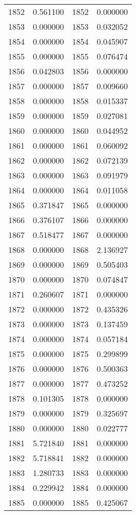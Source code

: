 \documentclass[12pt]{article}
\begin{document}
\begin{longtable}{@{}cccc@{}}
1852 & 0.561100 & 1852 & 0.000000 \\
1853 & 0.000000 & 1853 & 0.032052 \\
1854 & 0.000000 & 1854 & 0.045907 \\
1855 & 0.000000 & 1855 & 0.076474 \\
1856 & 0.042803 & 1856 & 0.000000 \\
1857 & 0.000000 & 1857 & 0.009660 \\
1858 & 0.000000 & 1858 & 0.015337 \\
1859 & 0.000000 & 1859 & 0.027081 \\
1860 & 0.000000 & 1860 & 0.044952 \\
1861 & 0.000000 & 1861 & 0.060092 \\
1862 & 0.000000 & 1862 & 0.072139 \\
1863 & 0.000000 & 1863 & 0.091979 \\
1864 & 0.000000 & 1864 & 0.011058 \\
1865 & 0.371847 & 1865 & 0.000000 \\
1866 & 0.376107 & 1866 & 0.000000 \\
1867 & 0.518477 & 1867 & 0.000000 \\
1868 & 0.000000 & 1868 & 2.136927 \\
1869 & 0.000000 & 1869 & 0.505403 \\
1870 & 0.000000 & 1870 & 0.074847 \\
1871 & 0.260607 & 1871 & 0.000000 \\
1872 & 0.000000 & 1872 & 0.435326 \\
1873 & 0.000000 & 1873 & 0.137459 \\
1874 & 0.000000 & 1874 & 0.057184 \\
1875 & 0.000000 & 1875 & 0.299899 \\
1876 & 0.000000 & 1876 & 0.500363 \\
1877 & 0.000000 & 1877 & 0.473252 \\
1878 & 0.101305 & 1878 & 0.000000 \\
1879 & 0.000000 & 1879 & 0.325697 \\
1880 & 0.000000 & 1880 & 0.022777 \\
1881 & 5.721840 & 1881 & 0.000000 \\
1882 & 5.718841 & 1882 & 0.000000 \\
1883 & 1.280733 & 1883 & 0.000000 \\
1884 & 0.229942 & 1884 & 0.000000 \\
1885 & 0.000000 & 1885 & 0.425067 \\

\end{longtable}
\end{document}
